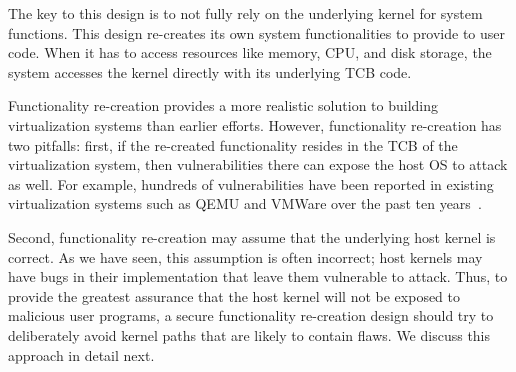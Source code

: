 
The key to this design is to not fully rely on the underlying
kernel for system functions. 
This design re-creates its own system functionalities to provide to user code.
When it has to %
access resources like memory, CPU, and disk storage, the system accesses the kernel directly with
its underlying TCB code.

Functionality re-creation provides a more realistic solution to building
virtualization systems than earlier efforts.
However, functionality re-creation has two pitfalls: 
first, if the re-created functionality resides in the TCB of the virtualization system, then vulnerabilities there can expose the host OS to attack as well.
For example, hundreds of vulnerabilities have been
reported in existing virtualization systems such as QEMU and VMWare over the past ten years~\cite{NVD}.

Second, functionality re-creation may assume that the underlying host kernel is correct. 
As we have seen, this assumption is often incorrect; host kernels may have bugs in their implementation that leave them vulnerable to attack. 
Thus, to provide the greatest assurance that the host kernel will not be exposed to malicious user programs, 
a secure functionality re-creation design should try to deliberately avoid kernel paths that are likely to contain flaws. 
We discuss this approach in detail next.

